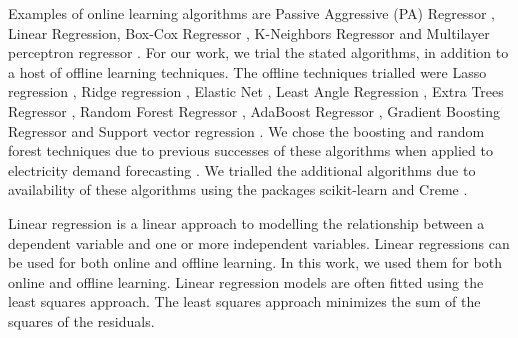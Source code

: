 \documentclass[final,3p,times,twocolumn,numbers]{elsarticle}
\begin{document}



Examples of online learning algorithms are Passive Aggressive (PA) Regressor \cite{Gzik2014}, Linear Regression, Box-Cox Regressor \cite{Box1964}, K-Neighbors Regressor \cite{forgy65} and Multilayer perceptron regressor \cite{Hinton1989}. For our work, we trial the stated algorithms, in addition to a host of offline learning techniques. The offline techniques trialled were Lasso regression \cite{Tibshirani1996a}, Ridge regression \cite{GeladiPaul1994Mrac},  Elastic Net \cite{Geostatistics2010}, Least Angle Regression \cite{Fike1988}, Extra Trees Regressor \cite{Fike1988}, Random Forest Regressor \cite{Breiman2001}, AdaBoost Regressor \cite{Freund1997}, Gradient Boosting Regressor \cite{316} and Support vector regression \cite{Cortes1995}. We chose the boosting and random forest techniques due to previous successes of these algorithms when applied to electricity demand forecasting \cite{Kell2018}. We trialled the additional algorithms due to availability of these algorithms using the packages scikit-learn and Creme \cite{scikit-learn,creme}. %



Linear regression is a linear approach to modelling the relationship between a dependent variable and one or more independent variables. Linear regressions can be used for both online and offline learning. In this work, we used them for both online and offline learning. Linear regression models are often fitted using the least squares approach. The least squares approach minimizes the sum of the squares of the residuals. 
\end{document}
